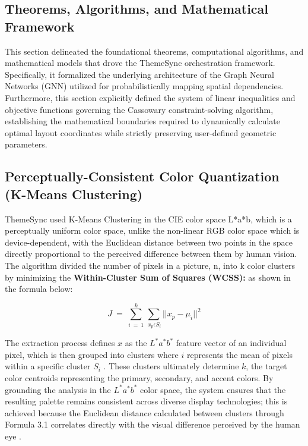\begin{refsection}
\section{Theorems, Algorithms, and Mathematical Framework}
This section delineated the foundational theorems, computational algorithms, and mathematical models that drove the ThemeSync orchestration framework. Specifically, it formalized the underlying architecture of the Graph Neural Networks (GNN) utilized for probabilistically mapping spatial dependencies. Furthermore, this section explicitly defined the system of linear inequalities and objective functions governing the Cassowary constraint-solving algorithm, establishing the mathematical boundaries required to dynamically calculate optimal layout coordinates while strictly preserving user-defined geometric parameters.

\subsection{Perceptually-Consistent Color Quantization (K-Means Clustering)}
ThemeSync used K-Means Clustering in the CIE color space L*a*b, which is a perceptually uniform color space, unlike the non-linear RGB color space which is device-dependent, with the Euclidean distance between two points in the space directly proportional to the perceived difference between them by human vision.
The algorithm divided the number of pixels in a picture, n, into k color clusters by minimizing the \textbf{Within-Cluster Sum of Squares (WCSS):} as shown in the formula below:

\begin{center}
\begin{minipage}{0.8\textwidth}
\begin{equation}
J\ =\ \sum_{i\ =\ 1}^{k}\sum_{{\ x}_p\epsilon S_i}||x_p-\mu_i{||}^2
\end{equation}
\centering
\end{minipage}
\end{center}

The extraction process defines $x$ as the $L^*a^*b^*$ feature vector of an individual pixel, which is then grouped into clusters where $i$ represents the mean of pixels within a specific cluster $S_i$ \cite{Lertrusdachakul2025Hybrid}. These clusters ultimately determine $k$, the target color centroids representing the primary, secondary, and accent colors. By grounding the analysis in the $L^*a^*b^*$ color space, the system ensures that the resulting palette remains consistent across diverse display technologies; this is achieved because the Euclidean distance calculated between clusters through Formula 3.1 correlates directly with the visual difference perceived by the human eye \cite{Garcia2023}.


\end{refsection}

